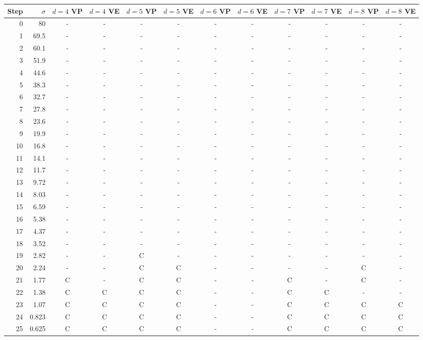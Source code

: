 \begin{tabular}{rrcccccccccc}
\toprule
Step & $\sigma$ & $d=4$ VP & $d=4$ VE & $d=5$ VP & $d=5$ VE & $d=6$ VP & $d=6$ VE & $d=7$ VP & $d=7$ VE & $d=8$ VP & $d=8$ VE \\
\midrule
0 & 80 & - & - & - & - & - & - & - & - & - & - \\
1 & 69.5 & - & - & - & - & - & - & - & - & - & - \\
2 & 60.1 & - & - & - & - & - & - & - & - & - & - \\
3 & 51.9 & - & - & - & - & - & - & - & - & - & - \\
4 & 44.6 & - & - & - & - & - & - & - & - & - & - \\
5 & 38.3 & - & - & - & - & - & - & - & - & - & - \\
6 & 32.7 & - & - & - & - & - & - & - & - & - & - \\
7 & 27.8 & - & - & - & - & - & - & - & - & - & - \\
8 & 23.6 & - & - & - & - & - & - & - & - & - & - \\
9 & 19.9 & - & - & - & - & - & - & - & - & - & - \\
10 & 16.8 & - & - & - & - & - & - & - & - & - & - \\
11 & 14.1 & - & - & - & - & - & - & - & - & - & - \\
12 & 11.7 & - & - & - & - & - & - & - & - & - & - \\
13 & 9.72 & - & - & - & - & - & - & - & - & - & - \\
14 & 8.03 & - & - & - & - & - & - & - & - & - & - \\
15 & 6.59 & - & - & - & - & - & - & - & - & - & - \\
16 & 5.38 & - & - & - & - & - & - & - & - & - & - \\
17 & 4.37 & - & - & - & - & - & - & - & - & - & - \\
18 & 3.52 & - & - & - & - & - & - & - & - & - & - \\
19 & 2.82 & - & - & C & - & - & - & - & - & - & - \\
20 & 2.24 & - & - & C & C & - & - & - & - & C & - \\
21 & 1.77 & C & - & C & C & - & - & C & - & C & - \\
22 & 1.38 & C & C & C & C & - & - & C & C & - & - \\
23 & 1.07 & C & C & C & C & - & - & C & C & C & C \\
24 & 0.823 & C & C & C & C & - & - & C & C & C & C \\
25 & 0.625 & C & C & C & C & - & - & C & C & C & C \\

\end{tabular}
